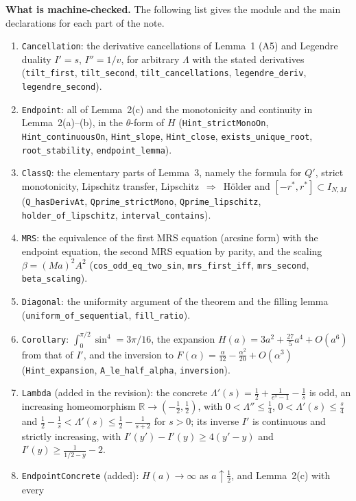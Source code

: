 \documentclass[11pt,a4paper]{article}
\theoremstyle{remark}
\newcommand{\R}{\mathbb R}
\numberwithin{equation}{section}
\begin{document}
\textbf{What is machine-checked.} The following list gives the module and the
main declarations for each part of the note.
\begin{enumerate}
\item \texttt{Cancellation}: the derivative cancellations of Lemma~1 (A5) and Legendre
duality $I'=s$, $I''=1/v$, for arbitrary $\Lambda$ with the stated derivatives
(\texttt{tilt\_first}, \texttt{tilt\_second}, \texttt{tilt\_cancellations},
\texttt{legendre\_deriv}, \texttt{legendre\_second}).
\item \texttt{Endpoint}: all of Lemma~2(c) and the monotonicity and continuity in
Lemma~2(a)--(b), in the $\theta$-form of $H$ (\texttt{Hint\_strictMonoOn},
\texttt{Hint\_continuousOn}, \texttt{Hint\_slope}, \texttt{Hint\_close},
\texttt{exists\_unique\_root}, \texttt{root\_stability}, \texttt{endpoint\_lemma}).
\item \texttt{ClassQ}: the elementary parts of Lemma~3, namely the formula for $Q'$, strict
monotonicity, Lipschitz transfer, Lipschitz~$\Rightarrow$~H\"older and
$[-r^*,r^*]\subset I_{N,M}$ (\texttt{Q\_hasDerivAt}, \texttt{Qprime\_strictMono},
\texttt{Qprime\_lipschitz}, \texttt{holder\_of\_lipschitz}, \texttt{interval\_contains}).
\item \texttt{MRS}: the equivalence of the first MRS equation (arcsine form) with the
endpoint equation, the second MRS equation by parity, and the scaling
$\beta=(Ma)^2A^2$ (\texttt{cos\_odd\_eq\_two\_sin}, \texttt{mrs\_first\_iff},
\texttt{mrs\_second}, \texttt{beta\_scaling}).
\item \texttt{Diagonal}: the uniformity argument of the theorem and the filling lemma
(\texttt{uniform\_of\_sequential}, \texttt{fill\_ratio}).
\item \texttt{Corollary}: $\int_0^{\pi/2}\sin^4=3\pi/16$, the expansion
$H(a)=3a^2+\frac{27}5a^4+O(a^6)$ from that of $I'$, and the inversion to
$F(\alpha)=\frac\alpha{12}-\frac{\alpha^2}{20}+O(\alpha^3)$
(\texttt{Hint\_expansion}, \texttt{A\_le\_half\_alpha}, \texttt{inversion}).
\item \texttt{Lambda} (added in the revision): the concrete $\Lambda'(s)=\frac12+\frac1{e^s-1}-\frac1s$ is odd,
an increasing homeomorphism $\R\to(-\frac12,\frac12)$, with $0<\Lambda''\le\frac14$,
$0<\Lambda'(s)\le\frac s4$ and $\frac12-\frac1s<\Lambda'(s)\le\frac12-\frac1{s+2}$ for $s>0$; its
inverse $I'$ is continuous and strictly increasing, with $I'(y')-I'(y)\ge4(y'-y)$ and
$I'(y)\ge\frac1{1/2-y}-2$.
\item \texttt{EndpointConcrete} (added): $H(a)\to\infty$ as $a\uparrow\frac12$, and Lemma~2(c) with every

\end{enumerate}
\end{document}
